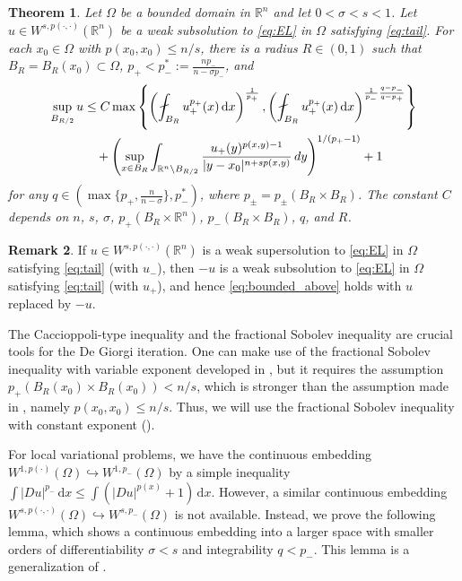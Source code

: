 \documentclass[11pt]{amsart}
\theoremstyle{plain}
\newtheorem{theorem}{Theorem}[section]
\theoremstyle{definition}
\newtheorem{remark}[theorem]{Remark}
\numberwithin{equation}{section}
\renewcommand{\d}{\textnormal{d}}
\newcommand{\R}{\mathbb{R}}
\begin{document}
\begin{theorem} \label{thm:local_boundedness2}
Let $\Omega$ be a bounded domain in $\mathbb{R}^n$ and let $0<\sigma<s<1$. Let $u \in W^{s, p(\cdot,\cdot)}(\mathbb{R}^n)$ be a weak subsolution to \eqref{eq:EL} in $\Omega$ satisfying \eqref{eq:tail}. For each $x_0 \in \Omega$ with $p(x_0, x_0) \leq n/s$, there is a radius $R \in (0,1)$ such that $B_{R} = B_{R}(x_0) \subset \Omega$, $p_+ < p_-^{\ast} := \frac{np_-}{n-\sigma p_-}$, and
\begin{equation} \label{eq:bounded_above}
\begin{split}
\sup_{B_{R/2}} u 
&\leq C\max \left\lbrace \left( \fint_{B_{R}} u_+^{p_+}(x) \,\mathrm{d}x \right)^{\frac{1}{p_+}}, \left( \fint_{B_{R}} u_+^{p_+}(x) \,\mathrm{d}x \right)^{\frac{1}{p_-} \frac{q-p_-}{q-p_+}} \right\rbrace \\
&\quad + \left( \sup_{x \in B_{R}} \int_{\R^n \setminus B_{R/2}} \frac{u_+(y)^{p(x,y)-1}}{|y-x_0|^{n+sp(x,y)}} \, \d y \right)^{1/(p_+-1)} + 1
\end{split}
\end{equation}
for any $q \in (\max\lbrace p_+, \frac{n}{n-\sigma} \rbrace, p_-^{\ast})$, where $p_\pm = p_\pm(B_{R} \times B_{R})$. The constant $C$ depends on $n$, $s$, $\sigma$, $p_+(B_R \times \mathbb{R}^n)$, $p_-(B_R \times B_R)$, $q$, and $R$.
\end{theorem}

\begin{remark}
If $u \in W^{s, p(\cdot,\cdot)}(\mathbb{R}^n)$ is a weak supersolution to \eqref{eq:EL} in $\Omega$ satisfying \eqref{eq:tail} (with $u_-$), then $-u$ is a weak subsolution to \eqref{eq:EL} in $\Omega$ satisfying \eqref{eq:tail} (with $u_+$), and hence \eqref{eq:bounded_above} holds with $u$ replaced by $-u$.
\end{remark}

The Caccioppoli-type inequality and the fractional Sobolev inequality are crucial tools for the De Giorgi iteration. One can make use of the fractional Sobolev inequality with variable exponent developed in \cite{HK19}, but it requires the assumption $p_+(B_{R}(x_0) \times B_{R}(x_0)) < n/s$, which is stronger than the assumption made in , namely $p(x_0, x_0) \leq n/s$. Thus, we will use the fractional Sobolev inequality with constant exponent ().

For local variational problems, we have the continuous embedding $W^{1,p(\cdot)}(\Omega) \hookrightarrow W^{1,p_-}(\Omega)$ by a simple inequality $\int |Du|^{p_-} \,\mathrm{d}x \leq \int (|Du|^{p(x)}+1)\,\mathrm{d}x$. However, a similar continuous embedding $W^{s, p(\cdot, \cdot)}(\Omega) \hookrightarrow W^{s, p_-}(\Omega)$ is not available. Instead, we prove the following lemma, which shows a continuous embedding into a larger space with smaller orders of differentiability $\sigma < s$ and integrability $q < p_-$. This lemma is a generalization of \cite[Lemma 4.6]{Coz17}.
\end{document}
